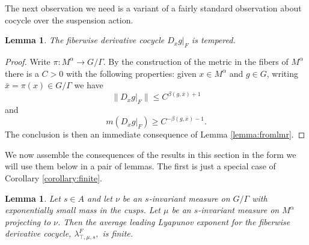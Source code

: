 \documentclass[10pt,reqno]{amsart}
\theoremstyle{Theorem}
\newtheorem{lemma}[theorem]{Lemma}
\theoremstyle{definition}
\theoremstyle{remark}
\newcommand{\note}[1]{\marginpar{{\color{red}\footnotesize \begin{spacing}{1}#1\end{spacing}}}}
\newcommand{\restrict}[2]{{#1}{|_{{ #2}}}}
\def\Folner{F{\o}lner }
\def\blue{}
\begin{document}
%
%

The next observation we need is a variant of a fairly standard observation about cocycle
over the suspension action.

\begin{lemma}
\label{lemma:tempered}
The fiberwise  derivative cocycle $\restrict{D_x g}{F}$ is tempered.
\end{lemma}


\begin{proof}
{\blue Write $\pi\colon M^\alpha \to G/\Gamma$.  By the construction of the metric in the fibers of $M^\alpha$ there is a $C>0$ with the following properties: given  $x\in M^\alpha$ and $g\in G$, writing $\bar x = \pi (x) \in G/\Gamma$ we have $$\| \restrict{D_x g}{F}\| \le C^{\beta(g,\bar x)+1}$$
and
$$m(\restrict{D_x g}{F})\ge C^{-\beta(g,\bar x)-1}.$$}
The conclusion is then an immediate consequence of Lemma \ref{lemma:fromlmr}. %
\end{proof}

We now assemble the consequences of the results in this section in the form we will use them below in a pair of lemmas.
The first is just a special case of Corollary \ref{corollary:finite}.

\begin{lemma}
\label{lemma:finite}
Let $s\in A$ and let $\nu$ be an $s$-invariant measure on $G/\Gamma$ with exponentially small mass in the cusps.  Let $\mu$ be an $s$-invariant measure on $M^\alpha$ projecting to $\nu$.  Then the average leading   Lyapunov exponent for the fiberwise derivative cocycle, $\lambda^F_{\top,\mu,s},$ is finite.
\end{lemma}
\end{document}
